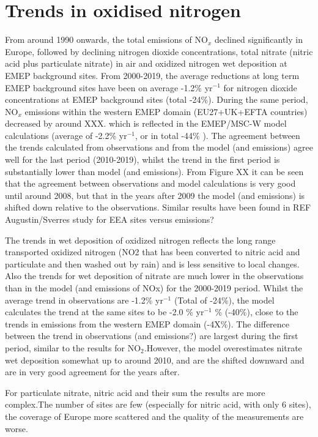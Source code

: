 \section{\label{sec:Trends_oxidised_nitrogen }Trends in oxidised nitrogen}



From around 1990 onwards, the total emissions of NO$_x$ declined significantly in Europe, followed by declining nitrogen dioxide concentrations, total nitrate (nitric acid plus particulate nitrate) in air and oxidized nitrogen wet deposition at EMEP background sites. From 2000-2019, the average reductions at long term EMEP background sites have been on average -1.2\% yr$^{-1}$ for nitrogen dioxide concentrations at EMEP background sites (total -24\%). During the same period, NO$_x$ emissions within the western EMEP domain (EU27+UK+EFTA countries) decreased by around XXX. which is reflected in the EMEP/MSC-W model calculations (average of -2.2\% yr$^{-1}$, or in total -44\% ). 
The agreement between the trends calculated from observations and from the model (and emissions) agree well for the last period (2010-2019), whilst the trend in the first period is substantially lower than model (and emissions). From Figure XX it can be seen that the agreement between observations and model calculations is very good until around 2008, but that in the years after 2009 the model (and emissions) is shifted down relative to the observations. Similar results have been found in REF Augustin/Sverres study for EEA sites versus emissions?


The trends in wet deposition of oxidized nitrogen reflects the long range transported oxidized nitrogen (NO2 that has been converted to nitric acid and particulate and then washed out by rain) and is less sensitive to local changes. Also the trends for wet deposition of nitrate are much lower in the observations than in the model (and emissions of NOx) for the 2000-2019 period. Whilst the average trend in observations are -1.2\% yr$^{-1}$ (Total of -24\%), the model calculates the trend at the same sites to be -2.0 \% yr$^{-1}$ \% (-40\%), close to the trends in emissions from the western EMEP domain (-4X\%). The difference between the trend in observations (and emissions?) are largest during the first period, similar to the results for NO$_2$.However, the model overestimates nitrate wet deposition somewhat up to around 2010, and are the shifted downward and are in very good agreement for the years after. 

For particulate nitrate, nitric acid and their sum the results are more complex.The number of sites are few (especially for nitric acid, with only 6 sites), the coverage of Europe more scattered and the quality of the measurements are worse. 

